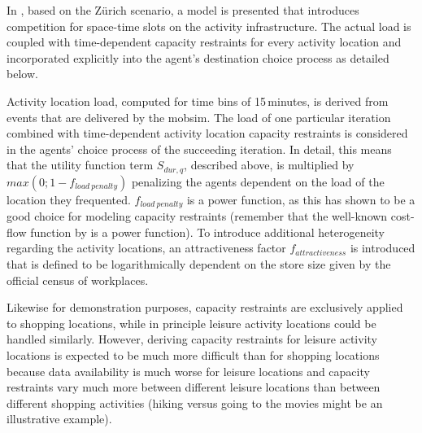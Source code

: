 In \citet[][]{HorniEtAl_TRR_2009}, based on the Zürich scenario, a 
model is presented that introduces competition for space-time slots on the activity infrastructure. 
The actual load is coupled with time-dependent capacity restraints
for every activity location and incorporated explicitly into the agent's destination choice process as detailed below.  

Activity location load, computed for time bins of 15\,minutes, is derived from events that are delivered by the \gls{mobsim}. 
The load of one particular iteration combined with time-dependent activity location capacity restraints is considered in the agents' choice process of the succeeding iteration. 
In detail, this means that the utility function term $S_{dur,q}$, described above, is multiplied by $max(0; 1 - f_{load\ penalty})$ penalizing the agents dependent on the load of the location they frequented. 
$f_{load\ penalty}$ is a power function, as this has shown to be a good choice for modeling capacity restraints (remember that the well-known cost-flow function by \citet[][]{TA_manual_1964} is a power function). 
To introduce additional heterogeneity regarding the activity locations, an attractiveness factor $f_{attractiveness}$ is introduced that is defined to be logarithmically dependent on the store size given by the official census of workplaces.

Likewise for demonstration purposes, capacity restraints are exclusively applied to shopping locations, while in principle leisure activity locations could be handled similarly. However, deriving capacity restraints for leisure activity locations is expected to be much more difficult than for shopping locations because data availability is much worse for leisure locations and capacity restraints vary much more between different leisure locations than between different shopping activities (hiking versus going to the movies might be an illustrative example).

